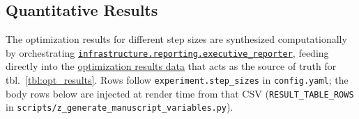 \documentclass[
]{article}
\begin{document}
\subsection{Quantitative Results}\label{quantitative-results}

The optimization results for different step sizes are synthesized
computationally by orchestrating
\href{https://github.com/docxology/template/blob/main/infrastructure/reporting/executive_reporter.py}{\texttt{infrastructure.reporting.executive\_reporter}},
feeding directly into the
\href{https://github.com/docxology/template/blob/main/projects/template_code_project/output/data/optimization_results.csv}{optimization
results data} that acts as the source of truth for
tbl.~\ref{tbl:opt_results}. Rows follow \texttt{experiment.step\_sizes}
in \texttt{config.yaml}; the body rows below are injected at render time
from that CSV (\texttt{RESULT\_TABLE\_ROWS} in
\texttt{scripts/z\_generate\_manuscript\_variables.py}).
\end{document}
